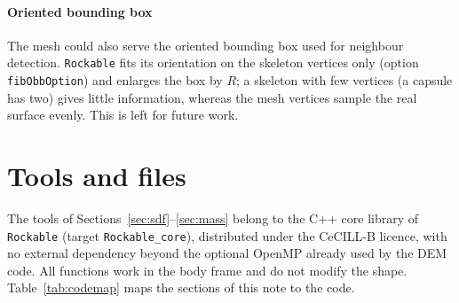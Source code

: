 \documentclass[11pt,a4paper]{article}
\newcommand{\Rmink}{R}                 %
\newcommand{\code}[1]{\texttt{#1}}
\begin{document}
\paragraph{Oriented bounding box} The mesh could also serve the oriented bounding
box used for neighbour detection. \code{Rockable} fits its orientation on the
skeleton vertices only (option \code{fibObbOption}) and enlarges the box by
$\Rmink$; a skeleton with few vertices (a capsule has two) gives little
information, whereas the mesh vertices sample the real surface evenly. This is left
for future work.

\section{Tools and files}
\label{sec:usage}

The tools of Sections~\ref{sec:sdf}--\ref{sec:mass} belong to the C++ core library
of \code{Rockable} (target \code{Rockable\_core}), distributed under the CeCILL-B
licence, with no external dependency beyond the optional OpenMP already used by
the DEM code. All functions work in the body frame and do not modify the shape.
Table~\ref{tab:codemap} maps the sections of this note to the code.
\end{document}
